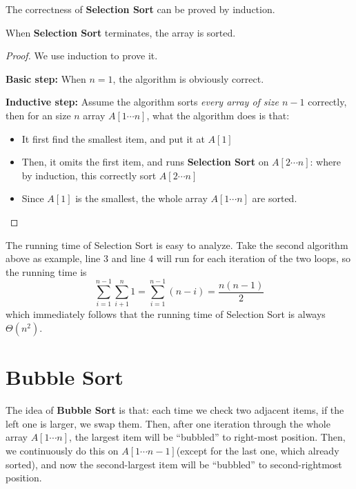\begin{spacing}{1.3}
\begin{algorithm*}[htbp]
    \end{algorithm*}

    The correctness of {\bf Selection Sort} can be proved by induction.
    \begin{theorem}
        When {\bf Selection Sort} terminates, the array is sorted.
    \end{theorem}
    \begin{proof}
        We use induction to prove it.

        {\bf Basic step:} When $n=1$, the algorithm is obviously correct.

        {\bf Inductive step:} Assume the algorithm sorts {\it every array of size $n-1$} correctly,
        then for an size $n$ array $A[1\cdots n]$, what the algorithm does is that:
        \begin{itemize}
            \item It first find the smallest item, and put it at $A[1]$
            \item Then, it omits the first item, and runs {\bf Selection Sort} on $A[2\cdots n]$:
            where by induction, this correctly sort $A[2\cdots n]$
            \item Since $A[1]$ is the smallest, the whole array $A[1\cdots n]$ are sorted.
        \end{itemize}
    \end{proof}


    The running time of Selection Sort is easy to analyze. Take the second algorithm above 
    as example, line 3 and line 4 will run for each iteration of the two loops, so 
    the running time is 
    $$\sum_{i=1}^{n-1}\sum_{i+1}^n 1=\sum_{i=1}^{n-1} (n-i)=\frac{n(n-1)}{2}$$
    which immediately follows that the running time of Selection Sort is always $\Theta(n^2)$.

    \section{Bubble Sort}

    The idea of {\bf Bubble Sort} is that: each time we check two adjacent items, 
    if the left one is larger, we swap them. Then, after one iteration through the whole 
    array $A[1\cdots n]$, the largest item will be ``bubbled'' to right-most position.
    Then, we continuously do this on $A[1\cdots n-1]$(except for the last one, which already 
    sorted), and now the second-largest item will be ``bubbled'' to second-rightmost position.


\end{spacing}

